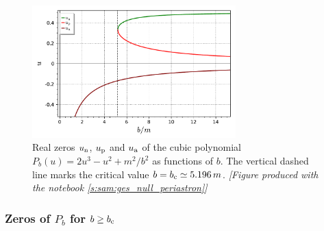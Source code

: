 \begin{figure}
\centerline{\includegraphics[width=0.7\textwidth]{gis_u_per_apo_neg.pdf}}
\caption[]{\label{f:gis:u_per_apo_neg} \footnotesize
Real zeros $u_{\rm n}$, $u_{\rm p}$ and $u_{\rm a}$ of the cubic polynomial
$P_b(u) =  2 u^3 - u^2 + {m^2}/{b^2}$ as functions of $b$. The vertical
dashed line marks the critical value
$b = b_{\rm c} \simeq 5.196\, m$.
\textsl{[Figure produced with the notebook \ref{s:sam:ges_null_periastron}]}
}
\end{figure}


\subsubsection{Zeros of $P_b$ for $b\geq b_{\rm c}$}

